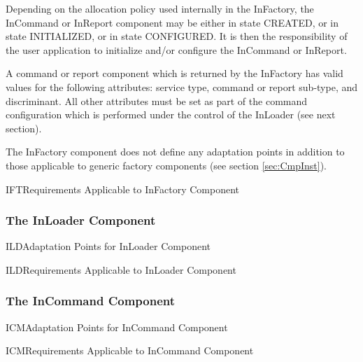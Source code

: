 \documentclass[a4paper,10pt]{article}
\newenvironment{cr_req}[2]
{%
\begin{longtable}{|l|p{9.8cm}|}
\caption{#2} \\
\hline
\rowcolor{light-gray}
\textbf{Req. ID} & \textbf{Requirement Text}\\
\hline\hline
\endfirsthead
\rowcolor{light-gray}
\textbf{Req. ID} & \textbf{Requirement Text}\\
\hline\hline
\endhead
\DTLforeach*[\DTLiseq{\cat}{#1}]{dbReq}{\cat=Category,\type=Type,\id=Id,\reqText=Text}
{\DTLiffirstrow{}{\\\hline}\cat-\id/\type & \textit{\reqText}}\\\hline
}
{\end{longtable}}
\newenvironment{cr_ap}[2]
{%
\begin{longtable}{|l|p{4.7cm}|p{4.9cm}|}
\caption{#2} \\
\hline
\rowcolor{light-gray}
\textbf{AP ID} & \textbf{Adaptation Point} & \textbf{Default Value}\\
\hline\hline
\endfirsthead
\rowcolor{light-gray}
\textbf{AP ID} & \textbf{Adaptation Point} & \textbf{Default Value}\\
\hline\hline
\endhead
\DTLforeach*[\DTLiseq{\cat}{#1}]{dbAP}{\cat=Category,\id=Id,\ap=AP,\defValue=DefValue}
{\DTLiffirstrow{}{\\\hline}\cat-\id & \ap & \defValue}\\\hline
}
{\end{longtable}}
\begin{document}
Depending on the allocation policy used internally in the InFactory, the InCommand or InReport component may be either in state CREATED, or in state INITIALIZED, or in state CONFIGURED. It is then the responsibility of the user application to initialize and/or configure the InCommand or InReport.

A command or report component which is returned by the InFactory has valid values for the following attributes: service type, command or report sub-type, and discriminant. All other attributes must be set as part of the command configuration which is performed under the control of the InLoader (see next section).

The InFactory component does not define any adaptation points in addition to those applicable to generic factory components (see section \ref{sec:CmpInst}). 

\begin{cr_req}{IFT}{Requirements Applicable to InFactory Component}
\end{cr_req}


\subsubsection{The InLoader Component}\label{sec:InLoader}


\begin{cr_ap}{ILD}{Adaptation Points for InLoader Component}
\end{cr_ap}

\begin{cr_req}{ILD}{Requirements Applicable to InLoader Component}
\end{cr_req}

\subsubsection{The InCommand Component}\label{sec:InCommand}


\begin{cr_ap}{ICM}{Adaptation Points for InCommand Component}
\end{cr_ap}

\begin{cr_req}{ICM}{Requirements Applicable to InCommand Component}
\end{cr_req}
\end{document}
